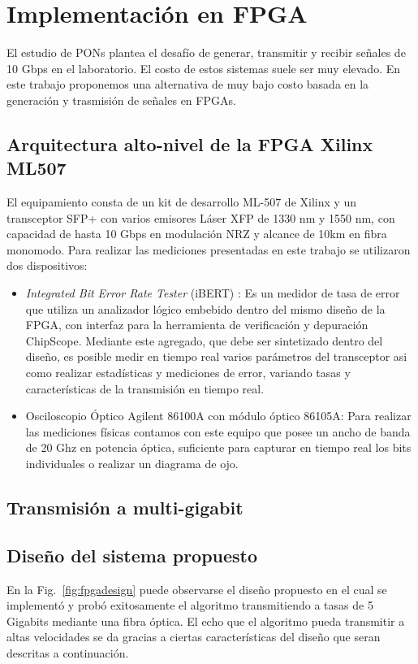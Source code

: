 \section{Implementación en FPGA}
El estudio de PONs plantea el desafío de generar, transmitir y recibir
señales de 10 Gbps en el laboratorio. El costo de estos sistemas
suele ser muy elevado. En este trabajo proponemos una alternativa de muy
bajo costo basada en la generación y trasmisión de señales en FPGAs.

\subsection{Arquitectura alto-nivel de la FPGA Xilinx ML507}
El equipamiento consta de un kit de desarrollo ML-507 de Xilinx y un
transceptor SFP+ con varios emisores Láser XFP de 1330 nm y 1550 nm, con capacidad de hasta 10 Gbps
en modulación NRZ y alcance de 10km en fibra monomodo. Para realizar
las mediciones presentadas en este trabajo se utilizaron dos dispositivos:
\begin{itemize}
 \item {\em Integrated Bit Error Rate Tester} (iBERT) \cite{4gtxs}: Es
un medidor de tasa de error que utiliza un analizador lógico embebido dentro
del mismo diseño de la FPGA, con interfaz para la herramienta de
verificación y depuración ChipScope. Mediante este agregado, que debe
ser sintetizado dentro del diseño, es posible medir en tiempo real
varios parámetros del transceptor asi como realizar estadísticas y
mediciones de error, variando tasas y características de la transmisión
en tiempo real.
 \item Osciloscopio Óptico Agilent 86100A con módulo óptico 86105A: Para
realizar las mediciones físicas contamos con este equipo que posee un
ancho de banda de 20 Ghz en potencia óptica, suficiente para capturar en
tiempo real los bits individuales o realizar un diagrama de ojo.
\end{itemize}
\subsection{Transmisión a multi-gigabit}
\subsection{Diseño del sistema propuesto}

En la Fig.~\ref{fig:fpgadesign} puede observarse el diseño propuesto en el cual se implementó y probó exitosamente el algoritmo transmitiendo a tasas de 5 Gigabits mediante una fibra óptica.
El echo que el algoritmo pueda transmitir a altas velocidades se da gracias a ciertas características del diseño que seran descritas a continuación.

